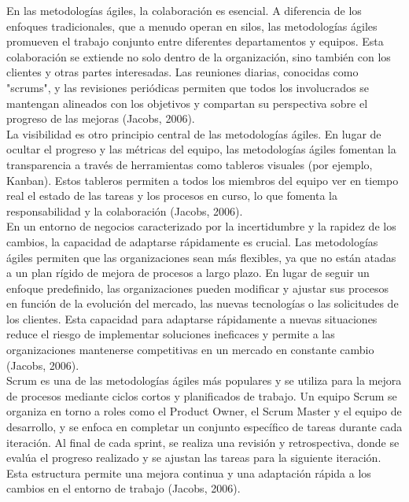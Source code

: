 \documentclass[12pt,letterpaper,spanish, xcolor=table]{report}
\numberwithin{figure}{subsection}
\begin{document}
En las metodologías ágiles, la colaboración es esencial. A diferencia de los enfoques tradicionales, que a menudo operan en silos, las metodologías ágiles promueven el trabajo conjunto entre diferentes departamentos y equipos. Esta colaboración se extiende no solo dentro de la organización, sino también con los clientes y otras partes interesadas. Las reuniones diarias, conocidas como "scrums", y las revisiones periódicas permiten que 
todos los involucrados se mantengan alineados con los objetivos y compartan su perspectiva sobre el progreso de las mejoras (Jacobs, 2006).\\

La visibilidad es otro principio central de las metodologías ágiles. En lugar de ocultar el progreso y las métricas del equipo, las metodologías ágiles fomentan la transparencia a través de herramientas como tableros visuales (por ejemplo, Kanban). Estos tableros permiten a todos los miembros del equipo ver en tiempo real el estado de las tareas y los procesos en curso, lo que fomenta la responsabilidad y la colaboración (Jacobs, 2006).\\

En un entorno de negocios caracterizado por la incertidumbre y la rapidez de los cambios, la capacidad de adaptarse rápidamente es crucial. Las metodologías ágiles permiten que las organizaciones sean más flexibles, ya que no están atadas a un plan rígido de mejora de procesos a largo plazo. En lugar de seguir un enfoque predefinido, las organizaciones pueden modificar y ajustar sus procesos en función de la evolución del mercado, las nuevas tecnologías o las solicitudes de los clientes. Esta capacidad para adaptarse 
rápidamente a nuevas situaciones reduce el riesgo de implementar soluciones ineficaces y permite a las organizaciones mantenerse competitivas en un mercado en constante cambio (Jacobs, 2006).\\

Scrum es una de las metodologías ágiles más populares y se utiliza para la mejora de procesos mediante ciclos cortos y planificados de trabajo. Un equipo Scrum se organiza en torno a roles como el Product Owner, el Scrum Master y el equipo de desarrollo, y se enfoca en completar un conjunto específico de tareas durante cada iteración. Al final de cada sprint, se realiza una revisión y retrospectiva, donde se evalúa el progreso realizado 
y se ajustan las tareas para la siguiente iteración. Esta estructura permite una mejora continua y una adaptación rápida a los cambios en el entorno de trabajo (Jacobs, 2006).\\
\end{document}
